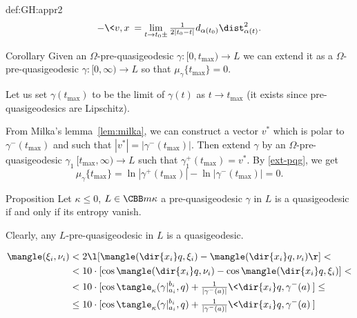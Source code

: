 {\begin{subthm}{def:GH:appr2}
$$-\<v,x\>=\lim_{t\to t_0\pm}\tfrac1{2|t_0-t|}d_{\alpha(t_0)}\dist_{\alpha(t)}^2.$$



















\begin{thm}{Corollary}\label{extension} Given an $\Omega$-pre-quasigeodesic
$\gamma:[0,t_{\max})\to L$ we can extend it as a $\Omega$-pre-quasigeodesic
$\gamma:[0,\infty)\to L$ so that $\mu_\gamma\{t_{\max}\}=0$.
\end{thm}

Let us set $\gamma(t_{\max})$ to be the limit of $\gamma(t)$ as $t\to t_{\max}$
(it exists since pre-quasigeodesics are Lipschitz).

From Milka's lemma~\ref{lem:milka}, we can construct a vector 
$v^*$ which is polar to $\gamma^-(t_{\max})$
and such that
$|v^*|=|\gamma^-(t_{\max})|$.
Then extend $\gamma$ by an $\Omega$-pre-quasigeodesic $\gamma_1\:[t_{\max},\infty)\to L$ such that $\gamma_1^+(t_{\max})=v^*$. 
By \ref{ext-pqg}, we get
$$\mu_\gamma\{t_{\max}\}=\ln|\gamma^+(t_{\max})|-\ln|\gamma^-(t_{\max}
)|=0.$$\qedsf














\begin{thm}{Proposition}\label{zero-entropy}
Let $\kappa\le 0$, $L\in\CBB m\kappa$ 
a pre-quasigeodesic $\gamma$ in $L$ is a quasigeodesic if and only if its entropy vanish.

Clearly, any $L$-pre-quasigeodesic in $L$ is a quasigeodesic.
\end{thm}


















\begin{align*}
 \mangle(\xi_i,\nu_i)
&<2\l[\mangle(\dir{x_i}q,\xi_i)-\mangle(\dir{x_i}q,\nu_i)\r]<
\\
&<10\cdot[\cos\mangle(\dir{x_i}q,\nu_i)-\cos\mangle(\dir{x_i}q,\xi_i)]
<
\\
&<10\cdot[\cos\tangle_\kappa(\gamma|_{a_i}^{b_i},q)+\tfrac1{|\gamma^-(a)|}\<\dir{x_i}q,\gamma^-(a)\>]
\le
\\
&\le
10\cdot[\cos\tangle_\kappa(\gamma|_{a_i}^{b_i},q)+\tfrac1{|\gamma^-(a)|}\<\dir{x_i}q,\gamma^-(a)\>]
\end{align*}



\end{subthm}}
